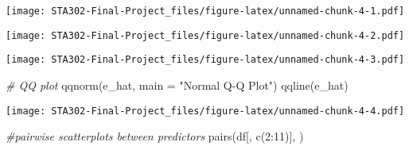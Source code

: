 \documentclass[
]{article}
\newenvironment{Shaded}{\begin{snugshade}}{\end{snugshade}}
\newcommand{\AttributeTok}[1]{\textcolor[rgb]{0.77,0.63,0.00}{#1}}
\newcommand{\CommentTok}[1]{\textcolor[rgb]{0.56,0.35,0.01}{\textit{#1}}}
\newcommand{\DecValTok}[1]{\textcolor[rgb]{0.00,0.00,0.81}{#1}}
\newcommand{\FunctionTok}[1]{\textcolor[rgb]{0.00,0.00,0.00}{#1}}
\newcommand{\NormalTok}[1]{#1}
\newcommand{\SpecialCharTok}[1]{\textcolor[rgb]{0.00,0.00,0.00}{#1}}
\newcommand{\StringTok}[1]{\textcolor[rgb]{0.31,0.60,0.02}{#1}}
\begin{document}
\texttt{[image: STA302-Final-Project\_files/figure-latex/unnamed-chunk-4-1.pdf]}

\begin{Shaded}
\end{Shaded}

\texttt{[image: STA302-Final-Project\_files/figure-latex/unnamed-chunk-4-2.pdf]}

\begin{Shaded}
\end{Shaded}

\texttt{[image: STA302-Final-Project\_files/figure-latex/unnamed-chunk-4-3.pdf]}

\begin{Shaded}
\begin{Highlighting}[]
\CommentTok{\# QQ plot}
\FunctionTok{qqnorm}\NormalTok{(e\_hat, }\AttributeTok{main =} \StringTok{"Normal Q{-}Q Plot"}\NormalTok{)}
\FunctionTok{qqline}\NormalTok{(e\_hat)}
\end{Highlighting}
\end{Shaded}

\texttt{[image: STA302-Final-Project\_files/figure-latex/unnamed-chunk-4-4.pdf]}

\begin{Shaded}
\begin{Highlighting}[]
\CommentTok{\#pairwise scatterplots between predictors}
\FunctionTok{pairs}\NormalTok{(df[, }\FunctionTok{c}\NormalTok{(}\DecValTok{2}\SpecialCharTok{:}\DecValTok{11}\NormalTok{)], )}
\end{Highlighting}
\end{Shaded}
\end{document}
